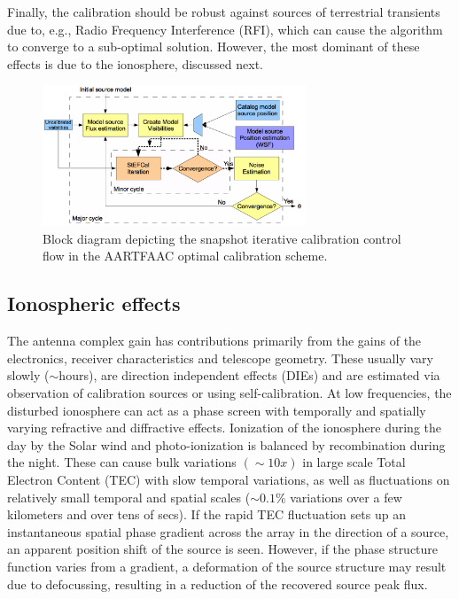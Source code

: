 \documentclass{aa}
\begin{document}
Finally,  the  calibration  should  be  robust against  sources  of  terrestrial
transients due to, e.g., Radio Frequency Interference (RFI), which can cause the
algorithm to converge to a  sub-optimal solution.  However, the most dominant of
these effects is due to the ionosphere, discussed next.

\begin{figure}[tbh]
\centering
\includegraphics[width=0.7\textwidth]{Figs/Fig2_blkdiag.png}
\caption{Block diagram depicting the snapshot
iterative calibration control flow in the AARTFAAC optimal calibration
scheme. }
\label{fig:Block-diagram-depicting}
\end{figure}

\subsection{\label{sub:All-Sky-cal-iono}Ionospheric effects}

The  antenna complex  gain has  contributions primarily  from the  gains  of the
electronics, receiver characteristics and telescope geometry. These usually vary
slowly ($\sim$hours), are direction independent effects (DIEs) and are estimated
via  observation  of calibration  sources  or  using  self-calibration.  At  low
frequencies, the disturbed ionosphere can  act as a phase screen with temporally
and  spatially varying refractive  and diffractive  effects.  Ionization  of the
ionosphere during the day by the  Solar wind and photo-ionization is balanced by
recombination   during   the   night.    These   can   cause   bulk   variations
$\left(\sim10x\right)$  in large scale  Total Electron  Content (TEC)  with slow
temporal variations,  as well as  fluctuations on relatively small  temporal and
spatial scales  ($\sim0.1\%$ variations over a  few kilometers and  over tens of
secs).   If the rapid  TEC fluctuation  sets up  an instantaneous  spatial phase
gradient across  the array in  the direction of  a source, an  apparent position
shift of  the source is seen.   However, if the phase  structure function varies
from  a gradient,  a  deformation of  the  source structure  may  result due  to
defocussing, resulting in a reduction of the recovered source peak flux.
\end{document}
